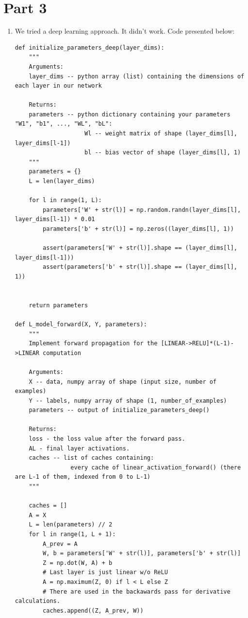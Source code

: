 \documentclass[12pt]{article}
\begin{document}
\section*{Part 3}
\begin{enumerate}[label=(\alph*)]
  \item
    We tried a deep learning approach. It didn't work. Code presented below:
    \begin{verbatim}
def initialize_parameters_deep(layer_dims):
    """
    Arguments:
    layer_dims -- python array (list) containing the dimensions of each layer in our network
    
    Returns:
    parameters -- python dictionary containing your parameters "W1", "b1", ..., "WL", "bL":
                    Wl -- weight matrix of shape (layer_dims[l], layer_dims[l-1])
                    bl -- bias vector of shape (layer_dims[l], 1)
    """
    parameters = {}
    L = len(layer_dims)

    for l in range(1, L):
        parameters['W' + str(l)] = np.random.randn(layer_dims[l], layer_dims[l-1]) * 0.01
        parameters['b' + str(l)] = np.zeros((layer_dims[l], 1))
        
        assert(parameters['W' + str(l)].shape == (layer_dims[l], layer_dims[l-1]))
        assert(parameters['b' + str(l)].shape == (layer_dims[l], 1))

        
    return parameters

def L_model_forward(X, Y, parameters):
    """
    Implement forward propagation for the [LINEAR->RELU]*(L-1)->LINEAR computation
    
    Arguments:
    X -- data, numpy array of shape (input size, number of examples)
    Y -- labels, numpy array of shape (1, number_of_examples)
    parameters -- output of initialize_parameters_deep()
    
    Returns:
    loss - the loss value after the forward pass.
    AL - final layer activations.
    caches -- list of caches containing:
                every cache of linear_activation_forward() (there are L-1 of them, indexed from 0 to L-1)
    """

    caches = []
    A = X
    L = len(parameters) // 2                  
    for l in range(1, L + 1):
        A_prev = A 
        W, b = parameters['W' + str(l)], parameters['b' + str(l)]
        Z = np.dot(W, A) + b
        # Last layer is just linear w/o ReLU
        A = np.maximum(Z, 0) if l < L else Z
        # There are used in the backawards pass for derivative calculations.
        caches.append((Z, A_prev, W))
    

\end{verbatim}
\end{enumerate}
\end{document}
